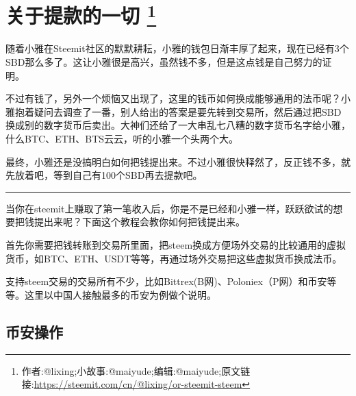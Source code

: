 \documentclass[]{ctexbook}
\begin{document}
\section[关于提款的一切 ]{\texorpdfstring{关于提款的一切 \footnote{作者:@lixing;小故事:@maiyude;编辑:@maiyude;原文链接:\url{https://steemit.com/cn/@lixing/or-steemit-steem}}}{关于提款的一切 }}

随着小雅在Steemit社区的默默耕耘，小雅的钱包日渐丰厚了起来，现在已经有3个SBD那么多了。这让小雅很是高兴，虽然钱不多，但是这点钱是自己努力的证明。

不过有钱了，另外一个烦恼又出现了，这里的钱币如何换成能够通用的法币呢？小雅抱着疑问去调查了一番，别人给出的答案是要先转到交易所，然后通过把SBD换成别的数字货币后卖出。大神们还给了一大串乱七八糟的数字货币名字给小雅，什么BTC、ETH、BTS云云，听的小雅一个头两个大。

最终，小雅还是没搞明白如何把钱提出来。不过小雅很快释然了，反正钱不多，就先放着吧，等到自己有100个SBD再去提款吧。

\begin{center}\rule{0.5\linewidth}{\linethickness}\end{center}

当你在steemit上赚取了第一笔收入后，你是不是已经和小雅一样，跃跃欲试的想要把钱提出来呢？下面这个教程会教你如何把钱提出来。

首先你需要把钱转账到交易所里面，把steem换成方便场外交易的比较通用的虚拟货币，如BTC、ETH、USDT等等，再通过场外交易把这些虚拟货币换成法币。

支持steem交易的交易所有不少，比如Bittrex(B网)、Poloniex（P网）和币安等等。这里以中国人接触最多的币安为例做个说明。

\subsection{币安操作}
\end{document}
